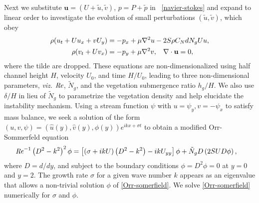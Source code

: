 \documentclass{jfm}
\newcommand{\bu}{\mathbf{u}}
\newcommand{\hg}{h_g}
\newcommand{\Ndg}{\tilde{N}_g}
\begin{document}
Next we substitute $\bu = (U+\tilde{u}, \tilde{v})$, $p=P+\tilde{p}$ in ~\eqref{navier-stokes} and expand to linear order to investigate the evolution of small perturbations $(\tilde{u}, \tilde{v})$, which obey
\begin{equation}
\begin{split}
\rho(u_t+U u_x+vU_y) &= -p_x+ {\mu}\nabla^2u-2S\rho C_{N}dN_{g}Uu, \\
\rho(v_t+ Uv_x) &= -p_y+ {\mu}\nabla^2v, \hspace{0.3cm} \nabla\cdot\bu=0,
\end{split} \nonumber
\end{equation}
where the tilde are dropped.
These equations are non-dimensionalized using half channel height $H$, velocity $U_0$, and time $H/U_0$, leading to three non-dimensional parameters, \textit{viz.} $\mbox{\textit{Re}}$, $\Ndg$, and the vegetation submergence ratio $\hg/H$. 
We also use $\delta/H$ in lieu of $\Ndg$ to parametrize the vegetation density and help elucidate the instability mechanism. 
Using a stream function $\psi$ with $u = \psi_{y}, v= -\psi_x$ to satisfy mass balance, we seek a solution of 
the form $\left(u,v,\psi \right)= \left(\hat u(y), \hat v(y), \phi(y) \right)e^{ikx+\sigma t}$ to obtain a modified Orr-Sommerfeld equation \citep{Drazin81,Chen97,Chu91} 
\begin{equation}
\begin{split}
\Rey^{-1}\left(D^2 -k^{2} \right)^2\phi &= \left[ \left({\sigma}+ikU\right) \left(D^2-k^2\right) -ikU_{yy}\right]\phi + \Ndg D\left(2 S U D \phi\right),
\label{Orr-somerfield}
\end{split}
\end{equation}
where $D=d/dy$, and subject to the boundary conditions $\phi = D^2\phi = 0$ at $y=0$ and $y=2$. 
The growth rate $\sigma$ for a given wave number $k$ appears as an eigenvalue that allows a non-trivial solution $\phi$ of  \eqref{Orr-somerfield}.
We solve \eqref{Orr-somerfield} numerically for $\sigma$ and $\phi$.
\end{document}
